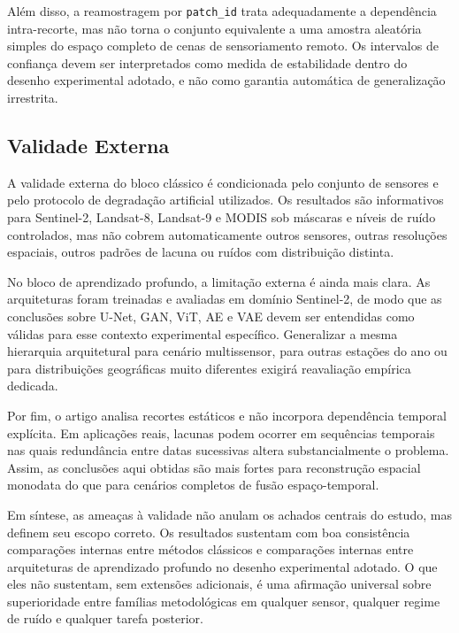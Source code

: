 Além disso, a reamostragem por \texttt{patch\_id} trata adequadamente a dependência intra-recorte, mas não torna o conjunto equivalente a uma amostra aleatória simples do espaço completo de cenas de sensoriamento remoto.
Os intervalos de confiança devem ser interpretados como medida de estabilidade dentro do desenho experimental adotado, e não como garantia automática de generalização irrestrita.

\subsection{Validade Externa}

A validade externa do bloco clássico é condicionada pelo conjunto de sensores e pelo protocolo de degradação artificial utilizados.
Os resultados são informativos para Sentinel-2, Landsat-8, Landsat-9 e MODIS sob máscaras e níveis de ruído controlados, mas não cobrem automaticamente outros sensores, outras resoluções espaciais, outros padrões de lacuna ou ruídos com distribuição distinta.

No bloco de aprendizado profundo, a limitação externa é ainda mais clara.
As arquiteturas foram treinadas e avaliadas em domínio Sentinel-2, de modo que as conclusões sobre U-Net, \gls{GAN}, \gls{ViT}, \gls{AE} e \gls{VAE} devem ser entendidas como válidas para esse contexto experimental específico.
Generalizar a mesma hierarquia arquitetural para cenário multissensor, para outras estações do ano ou para distribuições geográficas muito diferentes exigirá reavaliação empírica dedicada.

Por fim, o artigo analisa recortes estáticos e não incorpora dependência temporal explícita.
Em aplicações reais, lacunas podem ocorrer em sequências temporais nas quais redundância entre datas sucessivas altera substancialmente o problema.
Assim, as conclusões aqui obtidas são mais fortes para reconstrução espacial monodata do que para cenários completos de fusão espaço-temporal.

Em síntese, as ameaças à validade não anulam os achados centrais do estudo, mas definem seu escopo correto.
Os resultados sustentam com boa consistência comparações internas entre métodos clássicos e comparações internas entre arquiteturas de aprendizado profundo no desenho experimental adotado.
O que eles não sustentam, sem extensões adicionais, é uma afirmação universal sobre superioridade entre famílias metodológicas em qualquer sensor, qualquer regime de ruído e qualquer tarefa posterior.
